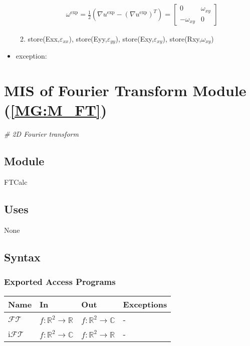 \documentclass[12pt, titlepage]{article}
\begin{document}
\begin{itemize}
\begin{enumerate}
\begin{equation*}
\begin{gathered}
\omega^{\text{exp}} = \frac{1}{2}(\nabla u^{\text{exp}}-(\nabla u^{\text{exp}})^{T})= \begin{bmatrix}
	0 & \omega_{\mathit{xy}} \\
	-\omega_{\mathit{xy}} & 0
	\end{bmatrix}
\end{gathered}
\end{equation*}
\item store(Exx,$\varepsilon_{\mathit{xx}}$), store(Eyy,$\varepsilon_{\mathit{yy}}$), store(Exy,$\varepsilon_{\mathit{xy}}$), store(Rxy,$\omega_{\mathit{xy}}$) 
\end{enumerate}  
\item exception:
\end{itemize}

\section{MIS of Fourier Transform Module (\texorpdfstring{\cref{MG:M_FT}}))} \label{MIS_FT}
\textit{{\#} 2D Fourier transform}
\subsection{Module}
FTCalc
\subsection{Uses}
None
\subsection{Syntax}

\subsubsection{Exported Access Programs}

\begin{center}
\begin{tabular}{p{2cm} p{4cm} p{4cm} p{2cm}}
\hline
\textbf{Name} & \textbf{In} & \textbf{Out} & \textbf{Exceptions} \\
\hline
$\mathcal{FT}$ & $f:\mathbb{R}^2\rightarrow\mathbb{R}$ & $f:\mathbb{R}^2\rightarrow\mathbb{C}$ & - \\
i$\mathcal{FT}$ & $f:\mathbb{R}^2\rightarrow\mathbb{C}$ & $f:\mathbb{R}^2\rightarrow\mathbb{R}$ & - \\
\hline
\end{tabular}
\end{center}
\end{document}
